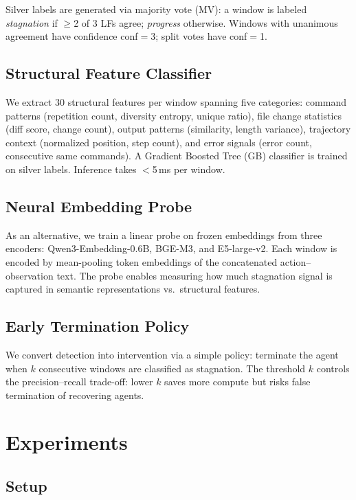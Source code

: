 \documentclass[11pt,a4paper]{article}
\begin{document}
Silver labels are generated via majority vote (MV): a window is labeled \emph{stagnation} if $\geq$2 of 3 LFs agree; \emph{progress} otherwise. Windows with unanimous agreement have confidence conf${=}$3; split votes have conf${=}$1.

\subsection{Structural Feature Classifier}

We extract 30 structural features per window spanning five categories: command patterns (repetition count, diversity entropy, unique ratio), file change statistics (diff score, change count), output patterns (similarity, length variance), trajectory context (normalized position, step count), and error signals (error count, consecutive same commands).
A Gradient Boosted Tree (GB) classifier is trained on silver labels. Inference takes $<$5\,ms per window.

\subsection{Neural Embedding Probe}

As an alternative, we train a linear probe on frozen embeddings from three encoders: Qwen3-Embedding-0.6B, BGE-M3, and E5-large-v2.
Each window is encoded by mean-pooling token embeddings of the concatenated action--observation text.
The probe enables measuring how much stagnation signal is captured in semantic representations vs.\ structural features.

\subsection{Early Termination Policy}

We convert detection into intervention via a simple policy: terminate the agent when $k$ consecutive windows are classified as stagnation.
The threshold $k$ controls the precision--recall trade-off: lower $k$ saves more compute but risks false termination of recovering agents.

\section{Experiments}

\subsection{Setup}
\end{document}
